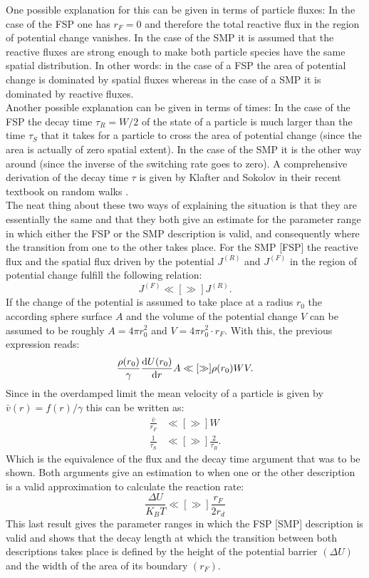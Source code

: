 One possible explanation for this can be given in terms of particle fluxes: In the case of the FSP one has $r_F=0$ and therefore the total reactive flux in the region of potential change vanishes. In the case of the SMP it is assumed that the reactive fluxes are strong enough to make both particle species have the same spatial distribution. In other words: in the case of a FSP the area of potential change is dominated by spatial fluxes whereas in the case of a SMP it is dominated by reactive fluxes.\\
Another possible explanation can be given in terms of times: In the case of the FSP the decay time $\tau_R = W/2$ of the state of a particle is much larger than the time $\tau_S$ that it takes for a particle to cross the area of potential change (since the area is actually of zero spatial extent). In the case of the SMP it is the other way around (since the inverse of the switching rate goes to zero). A comprehensive derivation of the decay time $\tau$ is given by Klafter and Sokolov in their recent textbook on random walks \cite{klafter2011first}.\\
The neat thing about these two ways of explaining the situation is that they are essentially the same and that they both give  an estimate for the parameter range in which either the FSP or the SMP description is valid, and consequently where the transition from one to the other takes place.
For the SMP [FSP] the reactive flux and the spatial flux driven by the potential $J^{(R)}$ and $J^{(F)}$ in the region of potential change fulfill the following relation:
\begin{equation}
    J^{(F)} \ll[\gg] J^{(R)}.
\end{equation}
If the change of the potential is assumed to take place at a radius $r_0$ the according sphere surface $A$ and the volume of the potential change $V$ can be assumed to be roughly $A=4 \pi r_0^2$ and $V=4 \pi r_0^2\cdot r_F$. With this, the previous expression reads:
\begin{equation}
    \frac{\rho(r_0)}{\gamma}\frac{{\rm d}U(r_0)}{{\rm d}r} A \ll[\gg]\rho(r_0) W V.
\end{equation}
    Since in the overdamped limit the mean velocity of a particle is given by $\bar{v}(r) = f(r)/\gamma$ this can be written as:
\begin{align}
    \frac{\bar{v}}{r_F} & \ll[\gg] W \nonumber \\
    \frac{1}{\tau_S} & \ll[\gg] \frac{2}{\tau_R}.
\end{align}
Which is the equivalence of the flux and the decay time argument that was to be shown.
Both arguments give an estimation to when one or the other description is a valid approximation to calculate the reaction rate:
\begin{equation}
    \frac{\Delta U}{K_B T} \ll[\gg] \frac{r_F}{2 r_d}
    \label{val_estimate}
\end{equation}
This last result gives the parameter ranges in which the FSP [SMP] description is valid and shows that the decay length at which the transition between both descriptions takes place is defined by the height of the potential barrier $(\Delta U)$ and the width of the area of its boundary $(r_F)$.

